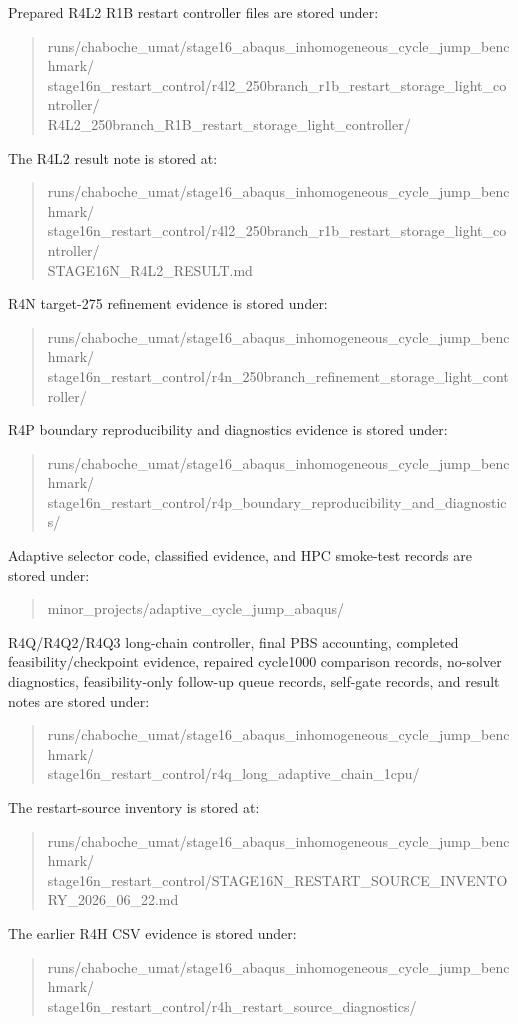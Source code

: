 \documentclass{article}
\begin{document}
Prepared R4L2 R1B restart controller files are stored under:
\begin{quote}\footnotesize\ttfamily
runs/chaboche\_umat/stage16\_abaqus\_inhomogeneous\_cycle\_jump\_benchmark/\\
stage16n\_restart\_control/r4l2\_250branch\_r1b\_restart\_storage\_light\_controller/\\
R4L2\_250branch\_R1B\_restart\_storage\_light\_controller/
\end{quote}
The R4L2 result note is stored at:
\begin{quote}\footnotesize\ttfamily
runs/chaboche\_umat/stage16\_abaqus\_inhomogeneous\_cycle\_jump\_benchmark/\\
stage16n\_restart\_control/r4l2\_250branch\_r1b\_restart\_storage\_light\_controller/\\
STAGE16N\_R4L2\_RESULT.md
\end{quote}
R4N target-275 refinement evidence is stored under:
\begin{quote}\footnotesize\ttfamily
runs/chaboche\_umat/stage16\_abaqus\_inhomogeneous\_cycle\_jump\_benchmark/\\
stage16n\_restart\_control/r4n\_250branch\_refinement\_storage\_light\_controller/
\end{quote}
R4P boundary reproducibility and diagnostics evidence is stored under:
\begin{quote}\footnotesize\ttfamily
runs/chaboche\_umat/stage16\_abaqus\_inhomogeneous\_cycle\_jump\_benchmark/\\
stage16n\_restart\_control/r4p\_boundary\_reproducibility\_and\_diagnostics/
\end{quote}
Adaptive selector code, classified evidence, and HPC smoke-test records are stored under:
\begin{quote}\footnotesize\ttfamily
minor\_projects/adaptive\_cycle\_jump\_abaqus/
\end{quote}
R4Q/R4Q2/R4Q3 long-chain controller, final PBS accounting, completed feasibility/checkpoint evidence, repaired cycle1000 comparison records, no-solver diagnostics, feasibility-only follow-up queue records, self-gate records, and result notes are stored under:
\begin{quote}\footnotesize\ttfamily
runs/chaboche\_umat/stage16\_abaqus\_inhomogeneous\_cycle\_jump\_benchmark/\\
stage16n\_restart\_control/r4q\_long\_adaptive\_chain\_1cpu/
\end{quote}
The restart-source inventory is stored at:
\begin{quote}\footnotesize\ttfamily
runs/chaboche\_umat/stage16\_abaqus\_inhomogeneous\_cycle\_jump\_benchmark/\\
stage16n\_restart\_control/STAGE16N\_RESTART\_SOURCE\_INVENTORY\_2026\_06\_22.md
\end{quote}
The earlier R4H CSV evidence is stored under:
\begin{quote}\footnotesize\ttfamily
runs/chaboche\_umat/stage16\_abaqus\_inhomogeneous\_cycle\_jump\_benchmark/\\
stage16n\_restart\_control/r4h\_restart\_source\_diagnostics/
\end{quote}
\end{document}
